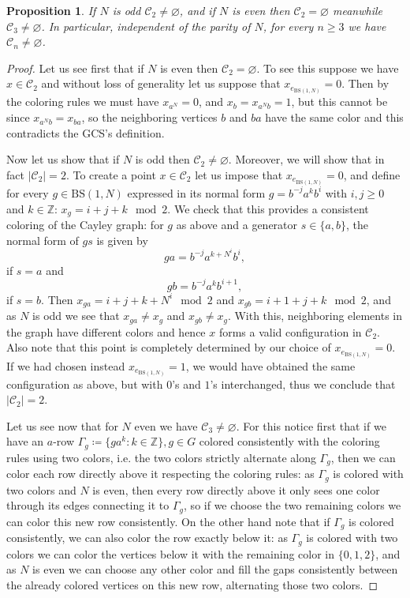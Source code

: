 \documentclass[letterpaper,10pt]{amsart}
\theoremstyle{plain}
\newtheorem{proposition}[theorem]{Proposition}
\newcommand{\BS}[1][N]{\mathrm{BS}(1,#1)}
\begin{document}
\begin{proposition}\label{prop:GCS_nonemptiness} If $N$ is odd $\mathcal{C}_2\neq \varnothing$, and if $N$ is even then $\mathcal{C}_2=\varnothing$ meanwhile $\mathcal{C}_3\neq \varnothing$. In particular, independent of the parity of $N$, for every $n\ge 3$ we have $\mathcal{C}_n\neq \varnothing$.
\end{proposition}
\begin{proof}
	Let us see first that if $N$ is even then $\mathcal{C}_2=\varnothing$. To see this suppose we have $x\in \mathcal{C}_2$ and without loss of generality let us suppose that $x_{e_{\BS}}=0$. Then by the coloring rules we must have $x_{a^{N}}=0$, and $x_{b}=x_{a^Nb}=1$, but this cannot be since $x_{a^Nb}=x_{ba}$, so the neighboring vertices $b$ and $ba$ have the same color and this contradicts the GCS's definition.
	
	
	Now let us show that if $N$ is odd then $\mathcal{C}_2\neq \varnothing$. Moreover, we will show that in fact $|\mathcal{C}_2|=2$. To create a point $x\in \mathcal{C}_2$ let us impose that $x_{e_{\BS}}=0$, and define for every $g\in \BS$ expressed in its normal form $g=b^{-j}a^kb^i$ with $i,j\ge 0$ and $k\in \mathbb{Z}$: $x_g=i+j+k \mod 2$. We check that this provides a consistent coloring of the Cayley graph:
	for $g$ as above and a generator $s\in \{a,b\}$, the normal form of $gs$ is given by
	$$
	ga=b^{-j}a^{k+N^i}b^{i},
	$$
	if $s=a$ and 
	$$
	gb=b^{-j}a^{k}b^{i+1},
	$$
	if $s=b$.
	Then $x_{ga}=i+j+k+N^i \mod 2$ and $x_{gb}=i+1+j+k \mod 2$, and as $N$ is odd we see that $x_{ga}\neq x_g$ and $x_{gb}\neq x_g$. With this, neighboring elements in the graph have different colors and hence $x$ forms a valid configuration in $\mathcal{C}_2$. Also note that this point is completely determined by our choice of $x_{e_{\BS}}=0.$ If we had chosen instead $x_{e_{\BS}}=1$, we would have obtained the same configuration as above, but with $0$'s and $1$'s interchanged, thus we conclude that $|\mathcal{C}_2|=2$.
	
	
	Let us see now that for $N$ even we have $\mathcal{C}_3\neq\varnothing$. For this notice first that if we have an $a$-row $\Gamma_g\coloneqq\{ga^k: k\in \mathbb{Z}\}, g\in G$ colored consistently with the coloring rules using two colors, i.e. the two colors strictly alternate along $\Gamma_g$, then we can color each row directly above it respecting the coloring rules: as $\Gamma_g$ is colored with two colors and $N$ is even, then every row directly above it only sees one color through its edges connecting it to $\Gamma_g$, so if we choose the two remaining colors we can color this new row consistently. On the other hand note that if $\Gamma_g$ is colored consistently, we can also color the row exactly below it: as $\Gamma_g$ is colored with two colors we can color the vertices below it with the remaining color in $\{0,1,2\}$, and as $N$ is even we can choose any other color and fill the gaps consistently between the already colored vertices on this new row, alternating those two colors.
	

\end{proof}
\end{document}
